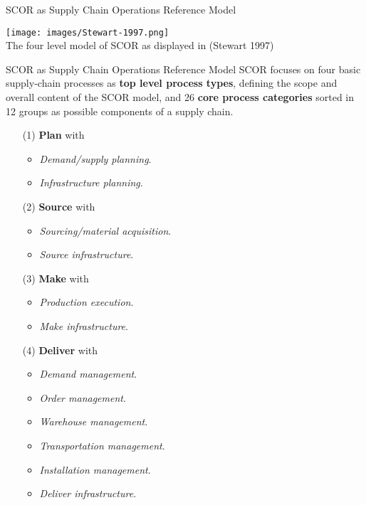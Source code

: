 \documentclass{beamer}
\begin{document}
\begin{frame}{SCOR as Supply Chain Operations Reference Model}

\begin{center}
  \texttt{[image: images/Stewart-1997.png]}\\
  The four level model of SCOR as displayed in (Stewart 1997)
\end{center}

\end{frame}

\begin{frame}{SCOR as Supply Chain Operations Reference Model}
SCOR focuses on four basic supply-chain processes as \textbf{top level process
  types}, defining the scope and overall content of the SCOR model, and 26
\textbf{core process categories} sorted in 12 groups as possible components of
a supply chain.

\begin{minipage}[t]{.45\textwidth}\small\raggedright
\begin{itemize}
\item[(1)] \textbf{Plan} with
  \begin{itemize}[leftmargin=0pt]
  \item \emph{Demand/supply planning}.
  \item \emph{Infrastructure planning}. 
  \end{itemize}
\item[(2)] \textbf{Source} with
  \begin{itemize}[leftmargin=0pt]
  \item \emph{Sourcing/material acquisition}.
  \item \emph{Source infrastructure}.  
  \end{itemize}
\item[(3)] \textbf{Make} with
  \begin{itemize}[leftmargin=0pt]
  \item \emph{Production execution}.
  \item \emph{Make infrastructure}. 
  \end{itemize}
\end{itemize}
\end{minipage}\hfill
\begin{minipage}[t]{.45\textwidth}\small\raggedright
\begin{itemize}
\item[(4)] \textbf{Deliver} with
  \begin{itemize}[leftmargin=0pt]
  \item \emph{Demand management}.
  \item \emph{Order management}.
  \item \emph{Warehouse management}.
  \item \emph{Transportation management}.
  \item \emph{Installation management}.
  \item \emph{Deliver infrastructure}.
  \end{itemize}
\end{itemize}
\end{minipage}
\end{frame}
\end{document}
